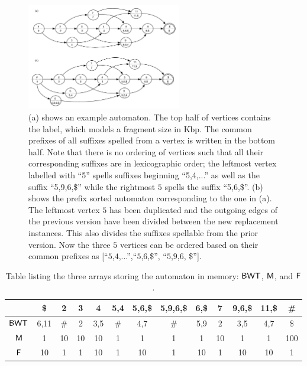 
\begin{figure}[h!]
 \centering
 \includegraphics[width=0.6\textwidth]{../content/figures/example_combined}
  \caption{(a) shows an example automaton.  The top half of vertices contains the label, which models a fragment size in Kbp.  The common prefixes of all suffixes spelled from a vertex is written in the bottom half.  Note that there is no ordering of vertices such that all their corresponding suffixes are in lexicographic order;  the leftmost vertex labelled with ``5'' spells suffixes beginning ``5,4,...'' as well as the suffix ``5,9,6,\$'' while the rightmost $5$  spells the suffix ``5,6,\$''. (b) shows the prefix sorted automaton corresponding to the one in (a).  The leftmost vertex $5$ has been duplicated and the outgoing edges of the previous version have been divided between the new replacement instances.  This also divides the suffixes spellable from the prior version.  Now the three $5$ vertices can be ordered based on their common prefixes as [``$5$,$4$,...'',``$5$,$6$,\$'', ``$5$,$9$,$6$, \$'']. }
\label{fig:example}
\end{figure}

\begin{table}[h!]
\begin{center}
  \begin{tabular}{ccccccccccccc}
  	\hline
		& \$		& 2		& 3		& 4		& 5,4		& 5,6,\$	& 5,9,6,\$	& 6,\$	& 7	& 9,6,\$	& 11,\$	& \# \\
	\hline
$\mbox{\rm {\sf BWT}}$	& 6,11	& \#		& 2		& 3,5		& \#		& 4,7		& \#		& 5,9		& 2	& 3,5		& 4,7		& \$ \\
$\mbox{\rm {\sf M}}$		& 1		& 10		& 10		& 10		& 1		& 1		& 1		& 1		&10	& 1		& 1 		& 100 \\
$\mbox{\rm {\sf F}}$		& 10		& 1		& 1		& 10		& 1		& 10		& 1		& 10		& 1	& 10		& 10		& 1 \\		
	\hline
	\end{tabular}
      \caption{Table listing the three arrays storing the automaton in memory: $\mbox{\rm {\sf BWT}}$, $\mbox{\rm {\sf M}}$, and $\mbox{\rm {\sf F}}$.}
 \label{bwt-table}
\end{center}
\end{table}


